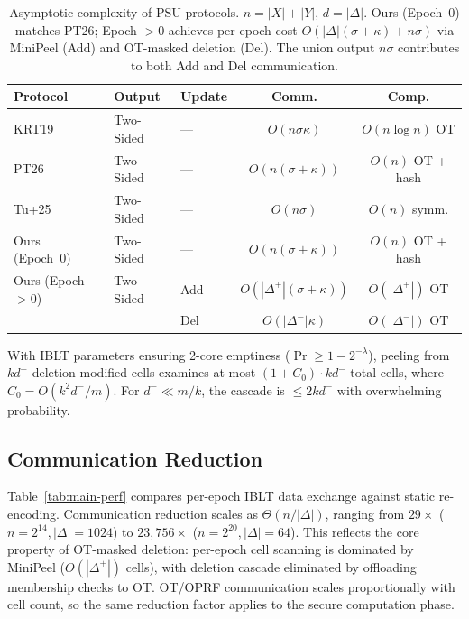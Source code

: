 \begin{table}[ht]
\centering
\footnotesize
\begin{tabular}{|l|l|l|c|c|}
\hline
\textbf{Protocol} & \textbf{Output} & \textbf{Update} & \textbf{Comm.} & \textbf{Comp.} \\
\hline\noalign{\vspace{-1pt}}\hline
KRT19~\cite{KRT19} & Two-Sided & --- & $O(n\sigma\kappa)$ & $O(n\log n)$ OT \\
PT26~\cite{PT26}   & Two-Sided & --- & $O(n(\sigma+\kappa))$ & $O(n)$ OT + hash \\
Tu+25~\cite{Tu+25} & Two-Sided & --- & $O(n\sigma)$ & $O(n)$ symm. \\
\hline\noalign{\vspace{-1pt}}\hline
Ours (Epoch~0)     & Two-Sided & --- & $O(n(\sigma+\kappa))$ & $O(n)$ OT + hash \\
\hline\noalign{\vspace{-1pt}}\hline
Ours (Epoch $>$0)  & Two-Sided & Add & $O(|\Delta^+|(\sigma+\kappa))$ & $O(|\Delta^+|)$ OT \\
                   &           & Del & $O(|\Delta^-|\kappa)$          & $O(|\Delta^-|)$ OT \\
\hline
\end{tabular}

\caption{Asymptotic complexity of PSU protocols.
$n = |X|+|Y|$, $d = |\Delta|$.
Ours (Epoch~0) matches PT26; Epoch $>$0 achieves
per-epoch cost $O(|\Delta|(\sigma+\kappa) + n\sigma)$ via MiniPeel (Add)
and OT-masked deletion (Del). The union output $n\sigma$ contributes
to both Add and Del communication.}
\label{tab:complexity}
\end{table}

\begin{lemma}\label{lem:cascade}
With IBLT parameters ensuring 2-core emptiness ($\Pr \geq 1 - 2^{-\lambda}$),
peeling from $k d^-$ deletion-modified cells examines at most $(1 + C_0) \cdot
k d^-$ total cells, where $C_0 = O(k^2 d^- / m)$. For $d^- \ll m/k$, the
cascade is $\leq 2k d^-$ with overwhelming probability.
\end{lemma}

\subsection{Communication Reduction}

Table~\ref{tab:main-perf} compares per-epoch IBLT data exchange against static
re-encoding. Communication reduction scales as $\Theta(n/|\Delta|)$,
ranging from $29\times$ ($n{=}2^{14}, |\Delta|{=}1024$) to
$23{,}756\times$ ($n{=}2^{20}, |\Delta|{=}64$). This reflects the core
property of OT-masked deletion: per-epoch cell scanning is dominated by
MiniPeel ($O(|\Delta^+|)$ cells), with deletion cascade eliminated by
offloading membership checks to OT. OT/OPRF communication scales
proportionally with cell count, so the same reduction factor applies to the
secure computation phase.

